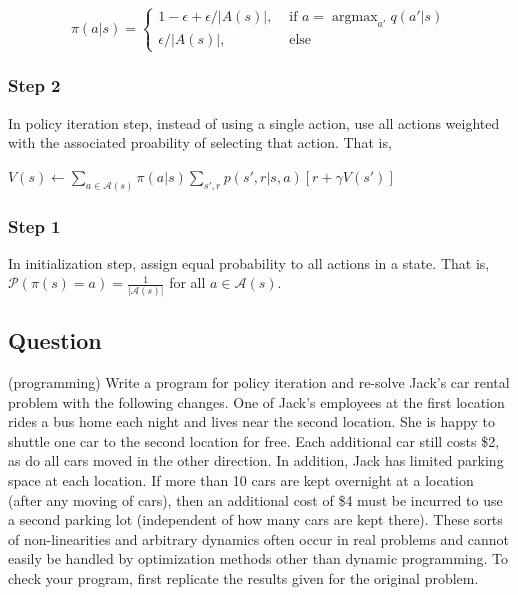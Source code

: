 \documentclass[11pt]{article}
\DeclareMathOperator*{\argmax}{argmax}
\begin{document}
    \begin{equation}
        \pi(a|s) =
        \begin{cases}
            1-\epsilon + \epsilon/|A(s)|,& \text{ if } a = \argmax_{a'}q(a'|s) \\
            \epsilon/|A(s)|,& \text{ else }
        \end{cases}
    \end{equation}

    \subsubsection*{Step 2}

    In policy iteration step, instead of using a single action, use all actions weighted with the associated proability of selecting that action. That is, 

    $V(s) \leftarrow \sum_{a \in \mathcal{A}(s)}\pi(a|s) \sum_{s',r}p(s',r|s,a)[r+\gamma V(s')]$

    \subsubsection*{Step 1}

    In initialization step, assign equal probability to all actions in a state. That is, $\mathcal{P}(\pi(s) = a) = \frac{1}{|\mathcal{A}(s)|}$ for all $a \in \mathcal{A}(s)$.

    \subsection{Question}

    (programming) Write a program for policy iteration and re-solve Jack’s car rental problem with the following changes.
    One of Jack’s employees at the first location rides a bus home each night and lives near the second location.
    She is happy to shuttle one car to the second location for free.
    Each additional car still costs \$2, as do all cars moved in the other direction.
    In addition, Jack has limited parking space at each location.
    If more than 10 cars are kept overnight at a location (after any moving of cars), then an additional cost of \$4 must be incurred to use a second parking lot (independent of how many cars are kept there).
    These sorts of non-linearities and arbitrary dynamics often occur in real problems and cannot easily be handled by optimization methods other than dynamic programming.
    To check your program, first replicate the results given for the original problem.
\end{document}
